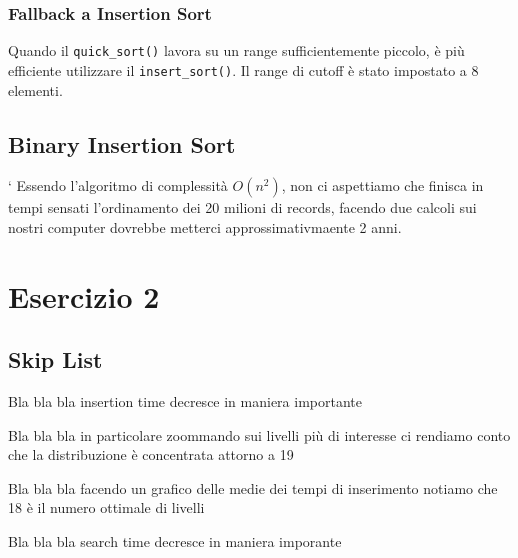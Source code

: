 \documentclass[12pt, letterpaper]{report}
\begin{document}
\newpage
\subsection{Fallback a Insertion Sort}
Quando il \verb|quick_sort()| lavora su un range sufficientemente piccolo, è più
efficiente utilizzare il \verb|insert_sort()|. Il range di cutoff è stato impostato a 8 elementi.

\section{Binary Insertion Sort}`
Essendo l'algoritmo di complessità $O(n^2)$, non ci aspettiamo che finisca in tempi
sensati l'ordinamento dei 20 milioni di records, facendo due calcoli sui nostri computer
dovrebbe metterci approssimativmaente 2 anni.
\begin{figure}[H]
\centering
    
\end{figure}

\chapter*{Esercizio 2}

\section{Skip List}

Bla bla bla insertion time decresce in maniera importante
\begin{figure}[H]
\centering
    
\end{figure}

Bla bla bla in particolare zoommando sui livelli più di interesse ci rendiamo conto
che la distribuzione è concentrata attorno a 19
\begin{figure}[H]
\centering
    
\end{figure}

Bla bla bla facendo un grafico delle medie dei tempi di inserimento notiamo che 18
è il numero ottimale di livelli
\begin{figure}[H]
\centering
    
\end{figure}

Bla bla bla search time decresce in maniera imporante
\begin{figure}[H]
\centering
    
\end{figure}
\end{document}
